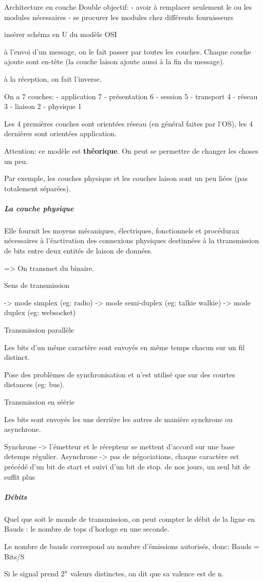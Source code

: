 Architecture en couche Double objectif: - avoir à remplacer seulement le
ou les modules nécessaires - se procurer les modules chez différents
fournisseurs

insérer schéma en U du modèle OSI

à l'envoi d'un message, on le fait passer par toutes les couches. Chaque
couche ajoute sont en-tête (la couche laison ajoute aussi à la fin du
message).

à la réception, on fait l'inverse.

On a 7 couches: - application 7 - présentation 6 - session 5 - transport
4 - réseau 3 - liaison 2 - physique 1

Les 4 premières couches sont orientées réseau (en général faites par
l'OS), les 4 dernières sont orientées application.

Attention: ce modèle est \textbf{théorique}. On peut se permettre de
changer les choses un peu.

Par exemple, les couches physique et les couches laison sont un peu
liées (pas totalement séparées).

\hypertarget{la-couche-physique}{%
\subparagraph{La couche physique}\label{la-couche-physique}}

Elle fournit les moyens mécaniques, électriques, fonctionnels et
procédurax nécessaires à l'éactivation des connexions physiques
destinnées à la ttransmission de bits entre deux entités de laison de
données.

=\textgreater{} On transmet du binaire.

Sens de transmission

-\textgreater{} mode simplex (eg: radio) -\textgreater{} mode
semi-duplex (eg: talkie walkie) -\textgreater{} mode duplex (eg:
websocket)

Transmission parallèle

Les bits d'un même caractère sont envoyés en même temps chacun sur un
fil distinct.

Pose des problèmes de synchronisation et n'est utilisé que sur des
courtes distances (eg: bus).

Transmission en séérie

Les bits sont envoyés les uns derrière les autres de manière synchrone
ou asynchrone.

Synchrone -\textgreater{} l'émetteur et le récepteur se mettent d'accord
sur une base detemps régulier. Asynchrone -\textgreater{} pas de
négociations, chaque caractère est précédé d'un bit de start et suivi
d'un bit de stop. de nos jours, un seul bit de suffit plus

\hypertarget{duxe9bits}{%
\subparagraph{Débits}\label{duxe9bits}}

Quel que soit le monde de transmission, on peut compter le débit de la
ligne en Bauds : le nombre de tops d'horloge en une seconde.

Le nombre de bauds correspond au nombre d'émissions autorisés, donc:
Bauds = Bits/S

Si le signal prend \(2^n\) valeurs distinctes, on dit que sa valence est
de n.
